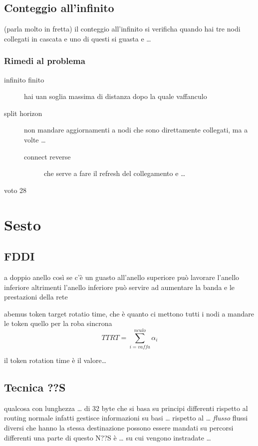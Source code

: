 \documentclass[11pt]{article}
\begin{document}
\subsection{Conteggio all'infinito}
\label{sec:org3657244}
(parla molto in fretta)
il conteggio all'infinito si verificha quando hai tre nodi collegati in cascata e uno di questi si guasta e \ldots{}

\subsubsection{Rimedi al problema}
\label{sec:org1386c1c}
\begin{description}
\item[{infinito finito}] hai uan soglia massima di distanza dopo la quale vaffanculo
\item[{split horizon}] non mandare aggiornamenti a nodi che sono direttamente collegati, ma a volte \ldots{}
\begin{description}
\item[{connect reverse}] che serve a fare il refresh del collegamento e \ldots{}
\end{description}
\end{description}

voto 28
\section{Sesto}
\label{sec:orgc3fdaa9}
\subsection{FDDI}
\label{sec:orgf72caab}
a doppio anello così se c'è un guasto all'anello superiore può lavorare l'anello inferiore
altrimenti l'anello inferiore può servire ad aumentare la banda e le prestazioni della rete

abemus token target rotatio time, che è quanto ci mettono tutti i nodi a mandare le token
quello per la roba sincrona
\[ TTRT = \sum_{i = vaffa}^{nculo} \alpha _i \]

il token rotation time è il valore\ldots{}

\subsection{Tecnica ??S}
\label{sec:org12fd5dd}
qualcosa con lunghezza \ldots{} di 32 byte che si basa su principi differenti rispetto al routing normale infatti gestisce informazioni su basi \ldots{} rispetto al \ldots{}
\emph{flusso}
flussi diversi che hanno la stessa destinazione possono essere mandati su percorsi differenti
una parte di questo N??S è \ldots{} su cui vengono instradate \ldots{}
\end{document}
